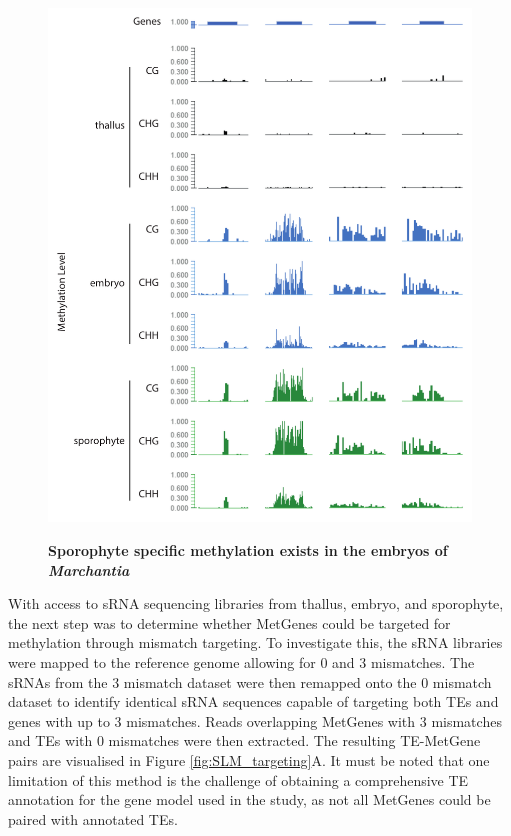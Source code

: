 \begin{figure}[htbp!] 
\centering    
    \includegraphics[width=1\textwidth]{Chapter3/Figs/Figure4_SLM_examples.pdf}
\caption{\textbf{Sporophyte specific methylation exists in the embryos of \textit{Marchantia}}}
\label{fig:SLM_examples}
\captionsetup{font=small}
    \caption*{}
\end{figure}

With access to sRNA sequencing libraries from thallus, embryo, and sporophyte, the next step was to determine whether MetGenes could be targeted for methylation through mismatch targeting. To investigate this, the sRNA libraries were mapped to the reference genome allowing for 0 and 3 mismatches. The sRNAs from the 3 mismatch dataset were then remapped onto the 0 mismatch dataset to identify identical sRNA sequences capable of targeting both TEs and genes with up to 3 mismatches. Reads overlapping MetGenes with 3 mismatches and TEs with 0 mismatches were then extracted. The resulting TE-MetGene pairs are visualised in Figure \ref{fig:SLM_targeting}A. It must be noted that one limitation of this method is the challenge of obtaining a comprehensive TE annotation for the gene model used in the study, as not all MetGenes could be paired with annotated TEs.

